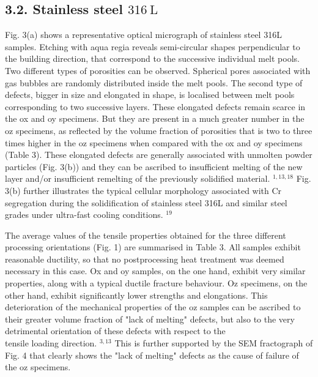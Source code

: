 \documentclass[10pt]{article}
\begin{document}
\subsection*{3.2. Stainless steel $316 \mathrm{~L}$}
Fig. 3(a) shows a representative optical micrograph of stainless steel 316L samples. Etching with aqua regia reveals semi-circular shapes perpendicular to the building direction, that correspond to the successive individual melt pools. Two different types of porosities can be observed. Spherical pores associated with gas bubbles are randomly distributed inside the melt pools. The second type of defects, bigger in size and elongated in shape, is localised between melt pools corresponding to two successive layers. These elongated defects remain scarce in the ox and oy specimens. But they are present in a much greater number in the oz specimens, as reflected by the volume fraction of porosities that is two to three times higher in the oz specimens when compared with the ox and oy specimens (Table 3). These elongated defects are generally associated with unmolten powder particles (Fig. 3(b)) and they can be ascribed to insufficient melting of the new layer and/or insufficient remelting of the previously solidified material. ${ }^{1,13,18}$ Fig. 3(b) further illustrates the typical cellular morphology associated with Cr segregation during the solidification of stainless steel 316L and similar steel grades under ultra-fast cooling conditions. ${ }^{19}$

The average values of the tensile properties obtained for the three different processing orientations (Fig. 1) are summarised in Table 3. All samples exhibit reasonable ductility, so that no postprocessing heat treatment was deemed necessary in this case. Ox and oy samples, on the one hand, exhibit very similar properties, along with a typical ductile fracture behaviour. Oz specimens, on the other hand, exhibit significantly lower strengths and elongations. This deterioration of the mechanical properties of the oz samples can be ascribed to their greater volume fraction of "lack of melting" defects, but also to the very detrimental orientation of these defects with respect to the\\
tensile loading direction. ${ }^{3,13}$ This is further supported by the SEM fractograph of Fig. 4 that clearly shows the "lack of melting" defects as the cause of failure of the oz specimens.
\end{document}
